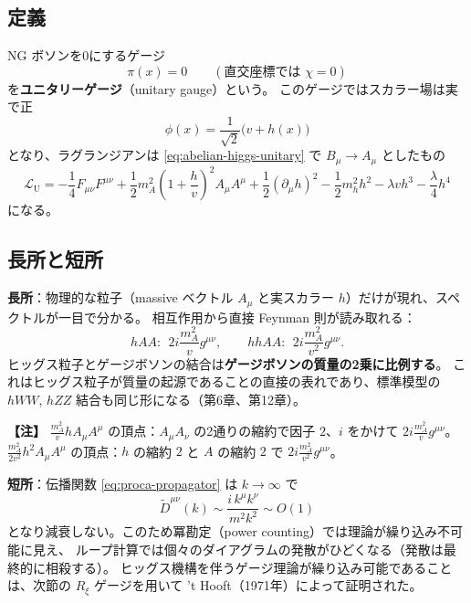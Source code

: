 \documentclass[uplatex,dvipdfmx,a4paper,11pt,openany]{jsbook}
\newcommand{\term}[2]{\textbf{#1}（#2）}
\newenvironment{note}{\vspace{1ex}\par\footnotesize\noindent\textbf{【注】}}{\par\vspace{1ex}}
\numberwithin{equation}{chapter}
\theoremstyle{definition}
\theoremstyle{plain}
\theoremstyle{remark}
\newcommand{\Lag}{\mathcal{L}}
\begin{document}
\subsection{定義}
NG ボソンを0にするゲージ
\begin{equation}
\pi(x)=0\qquad(\text{直交座標では }\chi=0)
\end{equation}
を\term{ユニタリーゲージ}{unitary gauge}という。
このゲージではスカラー場は実で正
\begin{equation}
\phi(x)=\frac{1}{\sqrt2}\bigl(v+h(x)\bigr)
\label{eq:unitary-gauge-phi}
\end{equation}
となり、ラグランジアンは \eqref{eq:abelian-higgs-unitary} で $B_\mu\to A_\mu$ としたもの
\begin{equation}
\Lag_{\mathrm{U}}=-\frac14F_{\mu\nu}F^{\mu\nu}+\frac12m_A^2\left(1+\frac hv\right)^2A_\mu A^\mu
+\frac12(\partial_\mu h)^2-\frac12m_h^2h^2-\lambda vh^3-\frac\lambda4h^4
\label{eq:L-unitary}
\end{equation}
になる。
\subsection{長所と短所}
\textbf{長所}：物理的な粒子（massive ベクトル $A_\mu$ と実スカラー $h$）だけが現れ、スペクトルが一目で分かる。
相互作用から直接 Feynman 則が読み取れる：
\begin{equation}
hAA:\ \ 2i\frac{m_A^2}{v}g^{\mu\nu},\qquad
hhAA:\ \ 2i\frac{m_A^2}{v^2}g^{\mu\nu}.
\label{eq:hAA-vertex}
\end{equation}
ヒッグス粒子とゲージボソンの結合は\textbf{ゲージボソンの質量の2乗に比例する}。
これはヒッグス粒子が質量の起源であることの直接の表れであり、標準模型の $hWW$, $hZZ$ 結合も同じ形になる（第6章、第12章）。
\begin{note}
$\frac{m_A^2}{v}hA_\mu A^\mu$ の頂点：$A_\mu A_\nu$ の2通りの縮約で因子 $2$、$i$ をかけて $2i\frac{m_A^2}{v}g^{\mu\nu}$。
$\frac{m_A^2}{2v^2}h^2A_\mu A^\mu$ の頂点：$h$ の縮約 $2$ と $A$ の縮約 $2$ で $2i\frac{m_A^2}{v^2}g^{\mu\nu}$。
\end{note}
\textbf{短所}：伝播関数 \eqref{eq:proca-propagator} は $k\to\infty$ で
\begin{equation}
\tilde D^{\mu\nu}(k)\sim\frac{i\,k^\mu k^\nu}{m^2k^2}\sim O(1)
\end{equation}
となり減衰しない。このため冪勘定（power counting）では理論が繰り込み不可能に見え、
ループ計算では個々のダイアグラムの発散がひどくなる（発散は最終的に相殺する）。
ヒッグス機構を伴うゲージ理論が繰り込み可能であることは、次節の $R_\xi$ ゲージを用いて
't Hooft（1971年）によって証明された。
\end{document}
